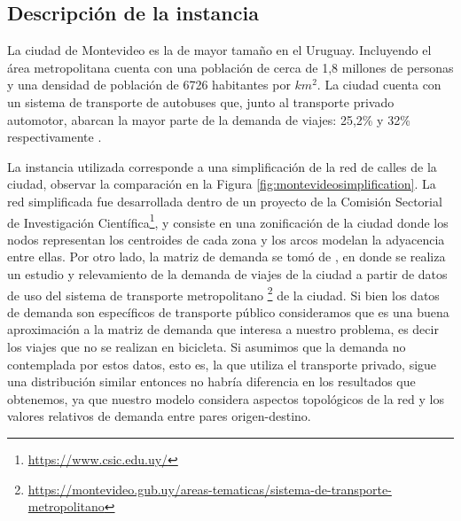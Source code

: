 \subsection{Descripción de la instancia}

La ciudad de Montevideo es la de mayor tamaño en el Uruguay. Incluyendo el área metropolitana cuenta con una población de cerca de 1,8 millones de personas y una densidad de población de 6726 habitantes por $km^2$. La ciudad cuenta con un sistema de transporte de autobuses que, junto al transporte privado automotor, abarcan la mayor parte de la demanda de viajes: 25,2\% y 32\% respectivamente \parencite{Mauttone2017a}.

La instancia utilizada corresponde a una simplificación de la red de calles de la ciudad, observar la comparación en la Figura \ref{fig:montevideosimplification}. La red simplificada fue desarrollada dentro de un proyecto de la Comisión Sectorial de Investigación Científica\footnote{\url{https://www.csic.edu.uy/}}, y consiste en una zonificación de la ciudad donde los nodos representan los centroides de cada zona y los arcos modelan la adyacencia entre ellas. Por otro lado, la matriz de demanda se tomó de \textcite{Massobrio2020}, en donde se realiza un estudio y relevamiento de la demanda de viajes de la ciudad a partir de datos de uso del sistema de transporte metropolitano \footnote{\url{https://montevideo.gub.uy/areas-tematicas/sistema-de-transporte-metropolitano}} de la ciudad. Si bien los datos de demanda son específicos de transporte público consideramos que es una buena aproximación a la matriz de demanda que interesa a nuestro problema, es decir los viajes que no se realizan en bicicleta. Si asumimos que la demanda no contemplada por estos datos, esto es, la que utiliza el transporte privado, sigue una distribución similar entonces no habría diferencia en los resultados que obtenemos, ya que nuestro modelo considera aspectos topológicos de la red y los valores relativos de demanda entre pares origen-destino.

